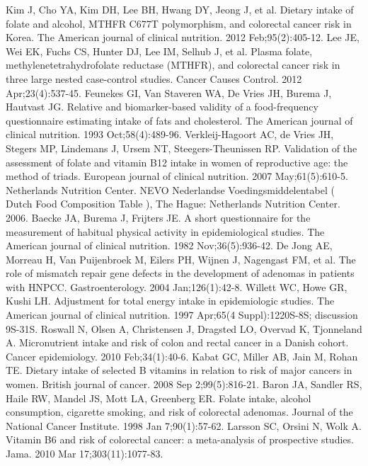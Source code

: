 \begin{thebibliography}{12}
		Kim J, Cho YA, Kim DH, Lee BH, Hwang DY, Jeong J, et al. Dietary intake of folate and alcohol, MTHFR C677T polymorphism, and colorectal cancer risk in Korea. The American journal of clinical nutrition. 2012 Feb;95(2):405-12. 
		Lee JE, Wei EK, Fuchs CS, Hunter DJ, Lee IM, Selhub J, et al. Plasma folate, methylenetetrahydrofolate reductase (MTHFR), and colorectal cancer risk in three large nested case-control studies. Cancer Causes Control. 2012 Apr;23(4):537-45. 
		Feunekes GI, Van Staveren WA, De Vries JH, Burema J, Hautvast JG. Relative and biomarker-based validity of a food-frequency questionnaire estimating intake of fats and cholesterol. The American journal of clinical nutrition. 1993 Oct;58(4):489-96. 
		Verkleij-Hagoort AC, de Vries JH, Stegers MP, Lindemans J, Ursem NT, Steegers-Theunissen RP. Validation of the assessment of folate and vitamin B12 intake in women of reproductive age: the method of triads. European journal of clinical nutrition. 2007 May;61(5):610-5. 
		Netherlands Nutrition Center. NEVO Nederlandse Voedingsmiddelentabel ( Dutch Food Composition Table ), The Hague: Netherlands Nutrition Center. 2006.
		Baecke JA, Burema J, Frijters JE. A short questionnaire for the measurement of habitual physical activity in epidemiological studies. The American journal of clinical nutrition. 1982 Nov;36(5):936-42. 
		De Jong AE, Morreau H, Van Puijenbroek M, Eilers PH, Wijnen J, Nagengast FM, et al. The role of mismatch repair gene defects in the development of adenomas in patients with HNPCC. Gastroenterology. 2004 Jan;126(1):42-8. 
		Willett WC, Howe GR, Kushi LH. Adjustment for total energy intake in epidemiologic studies. The American journal of clinical nutrition. 1997 Apr;65(4 Suppl):1220S-8S; discussion 9S-31S. 
		Roswall N, Olsen A, Christensen J, Dragsted LO, Overvad K, Tjonneland A. Micronutrient intake and risk of colon and rectal cancer in a Danish cohort. Cancer epidemiology. 2010 Feb;34(1):40-6. 
		Kabat GC, Miller AB, Jain M, Rohan TE. Dietary intake of selected B vitamins in relation to risk of major cancers in women. British journal of cancer. 2008 Sep 2;99(5):816-21. 
		Baron JA, Sandler RS, Haile RW, Mandel JS, Mott LA, Greenberg ER. Folate intake, alcohol consumption, cigarette smoking, and risk of colorectal adenomas. Journal of the National Cancer Institute. 1998 Jan 7;90(1):57-62. 
		Larsson SC, Orsini N, Wolk A. Vitamin B6 and risk of colorectal cancer: a meta-analysis of prospective studies. Jama. 2010 Mar 17;303(11):1077-83. 

\end{thebibliography}
